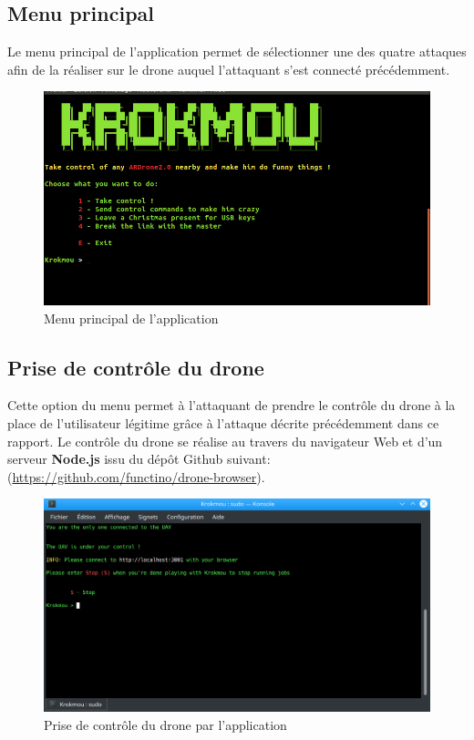\subsection{Menu principal}
Le menu principal de l'application permet de sélectionner une des quatre attaques afin de la réaliser sur le drone auquel l'attaquant s'est connecté précédemment.

\begin{figure}[H]
  \centering
  \includegraphics[scale=0.5]{images/main_menu}
  \caption{Menu principal de l'application}
\end{figure}

\subsection{Prise de contrôle du drone}
Cette option du menu permet à l'attaquant de prendre le contrôle du drone à la place de l'utilisateur légitime grâce à l'attaque décrite précédemment dans ce rapport. Le contrôle du drone se réalise au travers du navigateur Web et d'un serveur \textbf{Node.js} issu du dépôt Github suivant: (\url{https://github.com/functino/drone-browser}).\cite{ref5}

\begin{figure}[H]
  \centering
  \includegraphics[scale=0.35]{images/taking_control.png}
  \caption{Prise de contrôle du drone par l'application}
\end{figure}

